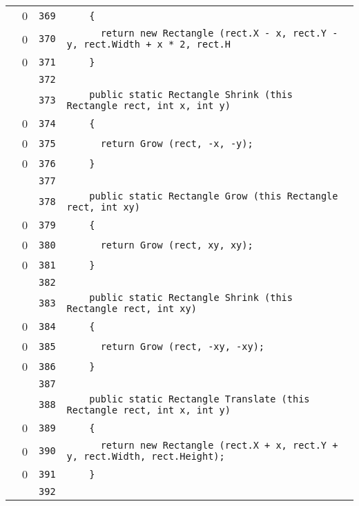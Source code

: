 \documentclass[a4paper,10pt]{article}
\begin{document}
\begin{longtable}[l]{lrrl}
\cellcolor{red} & 0 & \verb~369~ & \verb~    {~\\
\cellcolor{red} & 0 & \verb~370~ & \verb~      return new Rectangle (rect.X - x, rect.Y - y, rect.Width + x * 2, rect.H~\\
\cellcolor{red} & 0 & \verb~371~ & \verb~    }~\\
\cellcolor{gray} &  & \verb~372~ & \verb~~\\
\cellcolor{gray} &  & \verb~373~ & \verb~    public static Rectangle Shrink (this Rectangle rect, int x, int y)~\\
\cellcolor{red} & 0 & \verb~374~ & \verb~    {~\\
\cellcolor{red} & 0 & \verb~375~ & \verb~      return Grow (rect, -x, -y);~\\
\cellcolor{red} & 0 & \verb~376~ & \verb~    }~\\
\cellcolor{gray} &  & \verb~377~ & \verb~~\\
\cellcolor{gray} &  & \verb~378~ & \verb~    public static Rectangle Grow (this Rectangle rect, int xy)~\\
\cellcolor{red} & 0 & \verb~379~ & \verb~    {~\\
\cellcolor{red} & 0 & \verb~380~ & \verb~      return Grow (rect, xy, xy);~\\
\cellcolor{red} & 0 & \verb~381~ & \verb~    }~\\
\cellcolor{gray} &  & \verb~382~ & \verb~~\\
\cellcolor{gray} &  & \verb~383~ & \verb~    public static Rectangle Shrink (this Rectangle rect, int xy)~\\
\cellcolor{red} & 0 & \verb~384~ & \verb~    {~\\
\cellcolor{red} & 0 & \verb~385~ & \verb~      return Grow (rect, -xy, -xy);~\\
\cellcolor{red} & 0 & \verb~386~ & \verb~    }~\\
\cellcolor{gray} &  & \verb~387~ & \verb~~\\
\cellcolor{gray} &  & \verb~388~ & \verb~    public static Rectangle Translate (this Rectangle rect, int x, int y)~\\
\cellcolor{red} & 0 & \verb~389~ & \verb~    {~\\
\cellcolor{red} & 0 & \verb~390~ & \verb~      return new Rectangle (rect.X + x, rect.Y + y, rect.Width, rect.Height);~\\
\cellcolor{red} & 0 & \verb~391~ & \verb~    }~\\
\cellcolor{gray} &  & \verb~392~ & \verb~~\\

\end{longtable}
\end{document}
